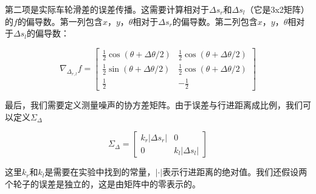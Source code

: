 
第二项是实际车轮滑差的误差传播。这需要计算相对于$\Delta s_r$和$\Delta s_l$（它是3x2矩阵）的$f$的偏导数。第一列包含$x，y，\theta$相对于$\Delta s_r$的偏导数。第二列包含$x，y，\theta$相对于$\Delta s_l$的偏导数：

\begin{equation}
\nabla_{\Delta_{r,l}} f=\left[
\begin{array}{cc}
\frac{1}{2}\cos(\theta+\Delta \theta/2) & \frac{1}{2}\cos(\theta+\Delta \theta/2)\\
\frac{1}{2}\sin(\theta+\Delta \theta/2) & \frac{1}{2}\cos(\theta+\Delta \theta/2)\\
\frac{1}{2} & -\frac{1}{2}
\end{array}
\right]
\end{equation}


最后，我们需要定义测量噪声的协方差矩阵。由于误差与行进距离成比例，我们可以定义$\Sigma_{\Delta}$

\begin{equation}
\Sigma_{\Delta}=\left[\begin{array}{cc}k_r|\Delta s_r| & 0\\0 & k_l|\Delta s_l|\end{array}\right]
\end{equation}





这里$k_r$和$k_l$是需要在实验中找到的常量，$|\cdot|$表示行进距离的绝对值。我们还假设两个轮子的误差是独立的，这是由矩阵中的零表示的。

